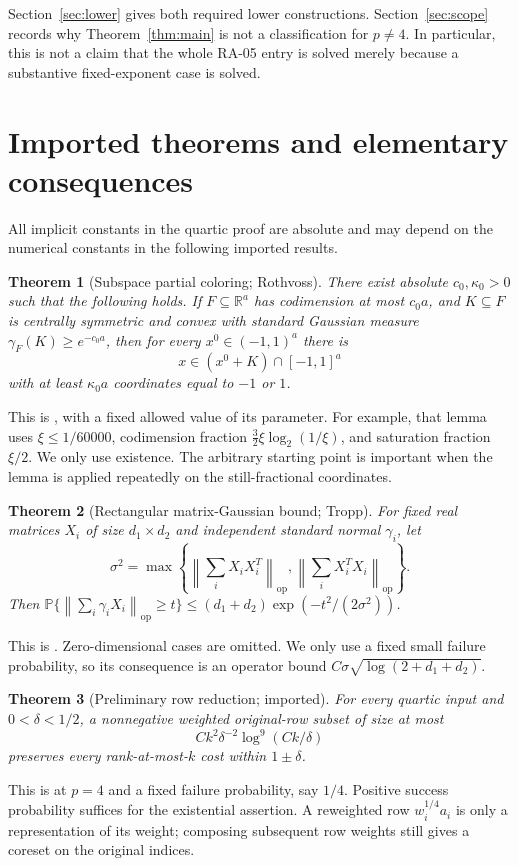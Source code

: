 \documentclass[11pt]{article}
\newtheorem{theorem}{Theorem}[section]
\theoremstyle{remark}\newtheorem{remark}[theorem]{Remark}
\newcommand{\R}{\mathbb R}\newcommand{\E}{\mathbb E}\newcommand{\Prob}{\mathbb P}
\newcommand{\op}{\mathrm{op}}\newcommand{\Frob}{\mathrm F}
\newcommand{\norm}[1]{\left\lVert#1\right\rVert}\newcommand{\abs}[1]{\left|#1\right|}
\numberwithin{equation}{section}
\begin{document}
Section~\ref{sec:lower} gives both required lower constructions. Section~\ref{sec:scope} records why Theorem~\ref{thm:main} is not a classification for $p\ne4$. In particular, this is not a claim that the whole RA-05 entry is solved merely because a substantive fixed-exponent case is solved.

\section{Imported theorems and elementary consequences}\label{sec:imports}
All implicit constants in the quartic proof are absolute and may depend on the numerical constants in the following imported results.

\begin{theorem}[Subspace partial coloring; Rothvoss]\label{thm:roth}
There exist absolute $c_0,\kappa_0>0$ such that the following holds. If $F\subseteq\R^a$ has codimension at most $c_0a$, and $K\subseteq F$ is centrally symmetric and convex with standard Gaussian measure
$\gamma_F(K)\ge e^{-c_0a}$, then for every $x^0\in(-1,1)^a$ there is
\[
 x\in(x^0+K)\cap[-1,1]^a
\]
with at least $\kappa_0a$ coordinates equal to $-1$ or $1$.
\end{theorem}
This is \cite[Lemma 9]{roth}, with a fixed allowed value of its parameter. For example, that lemma uses $\xi\le1/60000$, codimension fraction $\frac32\xi\log_2(1/\xi)$, and saturation fraction $\xi/2$. We only use existence. The arbitrary starting point is important when the lemma is applied repeatedly on the still-fractional coordinates.

\begin{theorem}[Rectangular matrix-Gaussian bound; Tropp]\label{thm:tropp}
For fixed real matrices $X_i$ of size $d_1\times d_2$ and independent standard normal $\gamma_i$, let
\[
 \sigma^2=\max\left\{\norm{\sum_iX_iX_i^T}_\op,
                         \norm{\sum_iX_i^TX_i}_\op\right\}.
\]
Then $\Prob\{\norm{\sum_i\gamma_iX_i}_\op\ge t\}
\le(d_1+d_2)\exp(-t^2/(2\sigma^2))$.
\end{theorem}
This is \cite[Theorem 1.5]{tropp}. Zero-dimensional cases are omitted. We only use a fixed small failure probability, so its consequence is an operator bound $C\sigma\sqrt{\log(2+d_1+d_2)}$.

\begin{theorem}[Preliminary row reduction; imported]\label{thm:presparse}
For every quartic input and $0<\delta<1/2$, a nonnegative weighted original-row subset of size at most
\[
 C k^2\delta^{-2}\log^9(Ck/\delta)
\]
preserves every rank-at-most-$k$ cost within $1\pm\delta$.
\end{theorem}
This is \cite[Theorem 1.2]{lmw} at $p=4$ and a fixed failure probability, say $1/4$. Positive success probability suffices for the existential assertion. A reweighted row $w_i^{1/4}a_i$ is only a representation of its weight; composing subsequent row weights still gives a coreset on the original indices.
\end{document}
